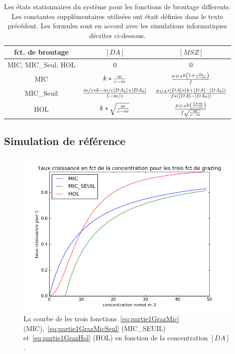 {\begin{table}[h!]
\begin{center}
\begin{tabular}{ | c | c c | }
\hline
fct. de broutage & $[DA]$ & $[MSZ]$ \\
\hline
MIC, MIC\_Seul, HOL & 0 & 0 \\
MIC & $k * {{m}\over{c-m}}$ & ${{\mu_{DA} k \left ( 1 + {{m}\over{c-m}} \right )}\over{f}}$ \\
MIC\_Seuil & ${{m/c*k-m/c[DA_0]+[DA_0]}\over{1-m/c}}$ & ${\mu_{DA} * [DA] * (k + [DA] - [DA_0])}\over{f *([DA] - [DA_0])}$ \\
HOL & $k*\sqrt{{{m}\over{c-m}}}$ & ${{\mu_{DA}k \left ( 1 + {m}\over{c-m} \right )}\over{f \sqrt{{m}\over{c-m}}}}$ \\
\hline
\end{tabular}
\end{center}
  \caption{Les états stationnaires du système pour les fonctions de broutage differents. Les
constantes supplémentaires utilisées ont était définies dans le texte précédent. Les formules sont en accord
avec les simulations informatiques décrites ci-dessous.
}
  \label{tab:partie1etatsStat}
\end{table}
\FloatBarrier

\subsection{Simulation de référence}

\begin{figure}[h!]
  \includegraphics[width=\textwidth]{partie1/grazingFct.png}
  \caption{
La courbe de les trois fonctions~\ref{eq:partie1GrazMic} (MIC),~\ref{eq:partie1GrazMicSeul} (MIC\_SEUIL)
et~\ref{eq:partie1GrazHol} (HOL) en fonction de la concentration $[DA]$.
}
  \label{fig:partie1grazingFcts}
\end{figure}

}

